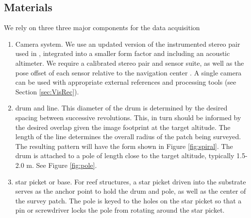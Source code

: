 
\subsection{Materials}
We rely on three three major components for the data acquisition
\begin{enumerate}
\item Camera system. We use an updated version of the instrumented stereo pair used in \cite{Henderson_2013} \cite{Camilli_2007}, integrated into a smaller form factor and including an acoustic altimeter. We require a calibrated stereo pair and sensor suite, as well as the pose offset of each sensor relative to the navigation center \cite{Johnson_Roberson_2013} \cite{Mahon_2008}. A single camera can be used with appropriate external references and processing tools (see Section \ref{sec:VisRec}).
\item drum and line. This diameter of the drum is determined by the desired spacing between successive revolutions. This, in turn should be informed by the desired overlap given the image footprint at the target altitude. The length of the line determines the overall radius of the patch being surveyed. The resulting pattern will have the form shown in Figure \ref{fig:spiral}. The drum is attached to a pole of length close to the target altitude, typically 1.5-2.0 m. See Figure \ref{fig:pole}.




\item star picket or base. For reef structures, a star picket driven into the substrate serves as the anchor point to hold the drum and pole, as well as the center of the survey patch. The pole is keyed to the holes on the star picket so that a pin or screwdriver locks the pole from rotating around the star picket.

\end{enumerate}


  